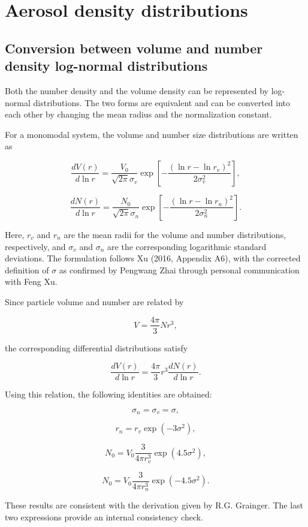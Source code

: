 \documentclass[
  11pt,
  letterpaper,
  DIV=11,
  numbers=noendperiod]{scrreprt}
\begin{document}
\section{Aerosol density
distributions}\label{aerosol-density-distributions}

\subsection{Conversion between volume and number density log-normal
distributions}\label{conversion-between-volume-and-number-density-log-normal-distributions}

Both the number density and the volume density can be represented by
log-normal distributions. The two forms are equivalent and can be
converted into each other by changing the mean radius and the
normalization constant.

For a monomodal system, the volume and number size distributions are
written as

\[
\frac{d V(r)}{d \ln r}= \frac{V_{0}}{\sqrt{2 \pi} \sigma_{v}} \exp\left[-\frac{(\ln r-\ln r_{v})^2}{2 \sigma_{v}^2}\right],
\]

\[
\frac{d N(r)}{d \ln r}= \frac{N_{0}}{\sqrt{2 \pi} \sigma_{n}} \exp\left[-\frac{(\ln r-\ln r_{n})^2}{2 \sigma_{n}^2}\right].
\]

Here, \(r_v\) and \(r_n\) are the mean radii for the volume and number
distributions, respectively, and \(\sigma_v\) and \(\sigma_n\) are the
corresponding logarithmic standard deviations. The formulation follows
Xu (2016, Appendix A6), with the corrected definition of \(\sigma\) as
confirmed by Pengwang Zhai through personal communication with Feng Xu.

Since particle volume and number are related by

\[
V=\frac{4\pi}{3}Nr^3,
\]

the corresponding differential distributions satisfy

\[
\frac{d V(r)}{d \ln r}=\frac{4\pi}{3} r^3 \frac{d N(r)}{d \ln r}.
\]

Using this relation, the following identities are obtained:

\[
\sigma_{n}=\sigma_{v}=\sigma,
\]

\[
r_{n}=r_{v} \exp(-3 \sigma^2),
\]

\[
N_{0}=V_{0} \frac{3}{4 \pi r_{v}^3}\exp(4.5 \sigma^2),
\]

\[
N_{0}=V_{0} \frac{3}{4 \pi r_{n}^3}\exp(-4.5 \sigma^2).
\]

These results are consistent with the derivation given by R.G. Grainger.
The last two expressions provide an internal consistency check.
\end{document}
